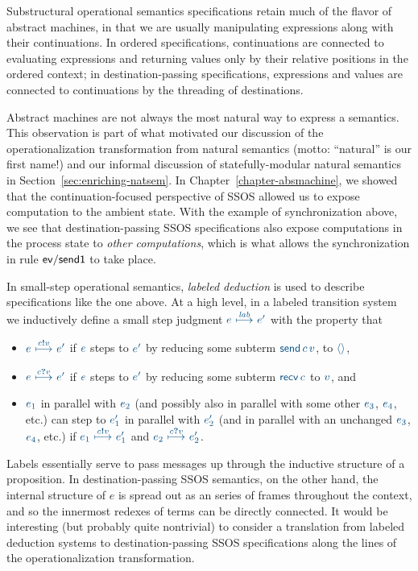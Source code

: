 Substructural operational semantics specifications retain much of the
flavor of abstract machines, in that we are usually manipulating
expressions along with their continuations. In ordered specifications,
continuations are connected to evaluating expressions and returning
values only by their relative positions in the ordered context; in
destination-passing specifications, expressions and values are
connected to continuations by the threading of destinations.

Abstract machines are not always the most natural
way to express a semantics. This observation is part of what
motivated our discussion of the operationalization transformation from
natural semantics (motto: ``natural'' is our first name!) 
and our informal
discussion of statefully-modular natural semantics in
Section~\ref{sec:enriching-natsem}.  In Chapter~\ref{chapter-absmachine}, 
we showed that the
continuation-focused perspective of SSOS allowed us to expose
computation to the ambient state. With the example of synchronization
above, we see that destination-passing SSOS specifications also expose
computations in the process state to {\it other computations}, which
is what allows the synchronization in rule ${\sf ev/send1}$ to take
place.

In small-step operational semantics, {\it labeled deduction} is used
to describe specifications like the one above. At a high level,
in a labeled transition system we
inductively define a small step judgment $\obj{e
  ~{\stackrel{\footnotesize{\it lab}}{\longmapsto}}~ e'}$ with the
property that \smallskip
\begin{itemize}
\item $\obj{e ~{\stackrel{\footnotesize{c{\textbf{!}}v}}{\longmapsto}}~
e'}$ if $\obj{e}$ steps to $\obj{e'}$ by reducing some subterm 
$\obj{{\sf send}\,c\,v}$,
to $\obj{\langle\rangle}$,
\item $\obj{e
~{\stackrel{\footnotesize{c{\textbf{?}}v}}{\longmapsto}}~ e'}$ if $\obj{e}$
steps to $\obj{e'}$ by reducing some subterm $\obj{{\sf recv}\,c}$ to 
$\obj{v}$, and 
\item $\obj{e_1}$ in parallel with $\obj{e_2}$ (and possibly also in
  parallel with some other $\obj{e_3}$, $\obj{e_4}$, etc.) can step to
  $\obj{e_1'}$ in parallel with $\obj{e_2'}$ (and in parallel with an
  unchanged $\obj{e_3}$, $\obj{e_4}$, etc.) if $\obj{e_1
    ~{\stackrel{\footnotesize{c{\textbf{!}}v}}{\longmapsto}}~ e_1'}$
  and $\obj{e_2
    ~{\stackrel{\footnotesize{c{\textbf{?}}v}}{\longmapsto}}~ e_2'}$.
\end{itemize}
\smallskip 
%
Labels essentially serve to pass messages up through the inductive
structure of a proposition.  In destination-passing SSOS semantics, on
the other hand, the internal structure of $e$ is spread out as an
series of frames throughout the context, and so the innermost redexes
of terms can be directly connected. It would be interesting (but
probably quite nontrivial) to consider a translation from labeled
deduction systems to destination-passing SSOS specifications along the
lines of the operationalization transformation.


